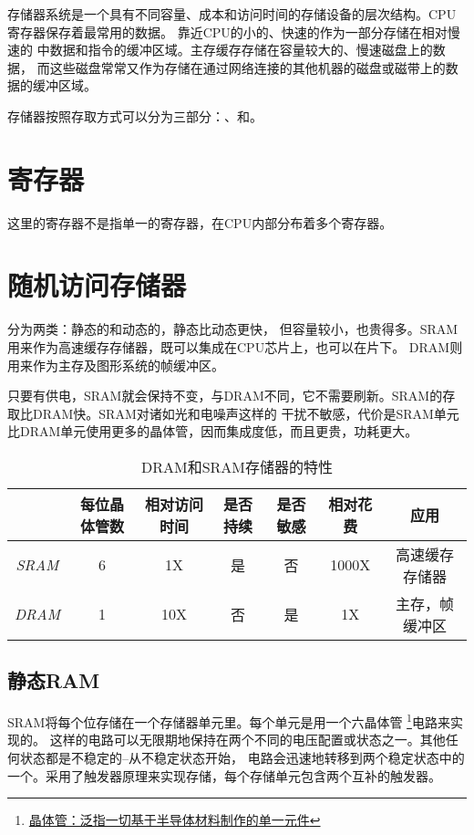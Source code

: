\documentclass{template}
\begin{document}
\ttfamily
存储器系统是一个具有不同容量、成本和访问时间的存储设备的层次结构。CPU寄存器保存着最常用的数据。
靠近CPU的小的、快速的作为一部分存储在相对慢速的
中数据和指令的缓冲区域。主存缓存存储在容量较大的、慢速磁盘上的数据，
而这些磁盘常常又作为存储在通过网络连接的其他机器的磁盘或磁带上的数据的缓冲区域。

存储器按照存取方式可以分为三部分：、和。

\section{寄存器}
    这里的寄存器不是指单一的寄存器，在CPU内部分布着多个寄存器。


\section{随机访问存储器}
    分为两类：静态的和动态的，静态比动态更快，
    但容量较小，也贵得多。SRAM用来作为高速缓存存储器，既可以集成在CPU芯片上，也可以在片下。
    DRAM则用来作为主存及图形系统的帧缓冲区。

    只要有供电，SRAM就会保持不变，与DRAM不同，它不需要刷新。SRAM的存取比DRAM快。SRAM对诸如光和电噪声这样的
    干扰不敏感，代价是SRAM单元比DRAM单元使用更多的晶体管，因而集成度低，而且更贵，功耗更大。

    \begin{table}[!h]
        \centering
        \begin{tabular}{c|c|c|c|c|c|c}
            \hline
                & 每位晶体管数 & 相对访问时间 & 是否持续 & 是否敏感 & 相对花费 & 应用 \\
            \hline
                \textit{SRAM} & 6 & 1X & 是 & 否 & 1000X & 高速缓存存储器 \\
            \hline
                \textit{DRAM} & 1 & 10X & 否 & 是 & 1X & 主存，帧缓冲区 \\
            \hline
        \end{tabular}
        \caption{DRAM和SRAM存储器的特性}
    \end{table}


    \subsection{静态RAM}
        SRAM将每个位存储在一个存储器单元里。每个单元是用一个六晶体管
        \footnote{\href{https://blog.csdn.net/SUPREME_SYZ/article/details/124642319}
        {晶体管：泛指一切基于半导体材料制作的单一元件}}电路来实现的。
        这样的电路可以无限期地保持在两个不同的电压配置或状态之一。其他任何状态都是不稳定的--从不稳定状态开始，
        电路会迅速地转移到两个稳定状态中的一个。采用了触发器原理来实现存储，每个存储单元包含两个互补的触发器。
\end{document}
